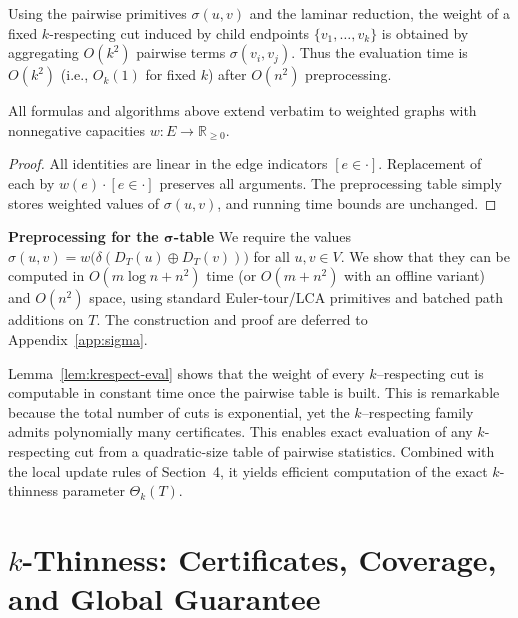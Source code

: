 \documentclass[11pt,letterpaper]{article}
\begin{document}
\begin{remark}
Using the pairwise primitives $\sigma(u,v)$ and the laminar reduction,
the weight of a fixed $k$-respecting cut induced by child endpoints $\{v_1,\dots,v_k\}$
is obtained by aggregating $O(k^2)$ pairwise terms $\sigma(v_i,v_j)$.
Thus the evaluation time is $O(k^2)$ (i.e., $O_k(1)$ for fixed $k$) after $O(n^2)$ preprocessing.
\end{remark}

\begin{lemma}
\label{lem:weighted}
All formulas and algorithms above extend verbatim to weighted graphs
with nonnegative capacities $w:E\to\mathbb{R}_{\ge 0}$.
\end{lemma}

\begin{proof}
All identities are linear in the edge indicators $[e\in\cdot]$.
Replacement of each by $w(e)\cdot [e\in\cdot]$ preserves all arguments.
The preprocessing table simply stores weighted values of
$\sigma(u,v)$, and running time bounds are unchanged.
\end{proof}


\medskip

\textbf{Preprocessing for the $\boldsymbol{\sigma}$-table}
We require the values $\sigma(u,v)=w\!\bigl(\delta(D_T(u)\oplus D_T(v))\bigr)$ for all
$u,v\in V$.
We show that they can be computed in $O(m\log n+n^2)$ time (or $O(m+n^2)$ with an offline variant)
and $O(n^2)$ space, using standard Euler-tour/LCA primitives and batched path additions on $T$.
The construction and proof are deferred to Appendix~\ref{app:sigma}.

Lemma~\ref{lem:krespect-eval} shows that the weight of every $k$--respecting cut
is computable in constant time once the pairwise table is built.
This is remarkable because the total number of cuts is exponential,
yet the $k$--respecting family admits polynomially many certificates. This enables exact evaluation of any $k$-respecting cut from a quadratic-size table of pairwise statistics.
Combined with the local update rules of Section~4, it yields efficient computation of the exact $k$-thinness parameter $\Theta_k(T)$.

\section{$k$-Thinness: Certificates, Coverage, and Global Guarantee}
\label{sec:thinness}

\end{document}
